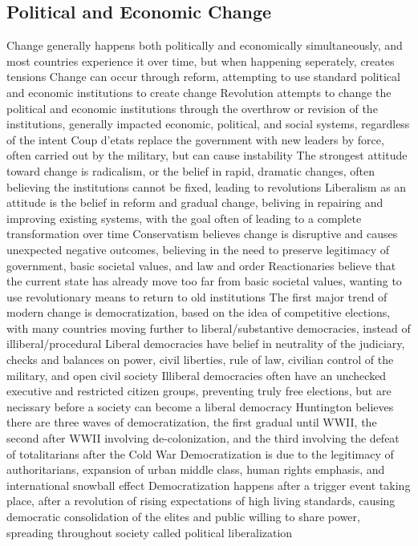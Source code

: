 \documentclass[11 pt, twoside]{article}
\newenvironment{outline*}
{
	\begin{outline}[enumerate]
	}
	{\end{outline}
}
\begin{document}
\subsection{Political and Economic Change}
\begin{outline*}
\1 Change generally happens both politically and economically simultaneously, and most countries experience it over time, but when happening seperately, creates tensions
\1 Change can occur through reform, attempting to use standard political and economic institutions to create change
\2 Revolution attempts to change the political and economic institutions through the overthrow or revision of the institutions, generally impacted economic, political, and social systems, regardless of the intent
\2 Coup d'etats replace the government with new leaders by force, often carried out by the military, but can cause instability
\1 The strongest attitude toward change is radicalism, or the belief in rapid, dramatic changes, often believing the institutions cannot be fixed, leading to revolutions
\2 Liberalism as an attitude is the belief in reform and gradual change, beliving in repairing and improving existing systems, with the goal often of leading to a complete transformation over time
\2 Conservatism believes change is disruptive and causes unexpected negative outcomes, believing in the need to preserve legitimacy of government, basic societal values, and law and order
\2 Reactionaries believe that the current state has already move too far from basic societal values, wanting to use revolutionary means to return to old institutions
\1 The first major trend of modern change is democratization, based on the idea of competitive elections, with many countries moving further to liberal/substantive democracies, instead of illiberal/procedural
\2 Liberal democracies have belief in neutrality of the judiciary, checks and balances on power, civil liberties, rule of law, civilian control of the military, and open civil society
\3 Illiberal democracies often have an unchecked executive and restricted citizen groups, preventing truly free elections, but are necissary before a society can become a liberal democracy
\2 Huntington believes there are three waves of democratization, the first gradual until WWII, the second after WWII involving de-colonization, and the third involving the defeat of totalitarians after the Cold War
\2 Democratization is due to the legitimacy of authoritarians, expansion of urban middle class, human rights emphasis, and international snowball effect
\2 Democratization happens after a trigger event taking place, after a revolution of rising expectations of high living standards, causing democratic consolidation of the elites and public willing to share power, spreading throughout society called political liberalization

\end{outline*}
\end{document}
